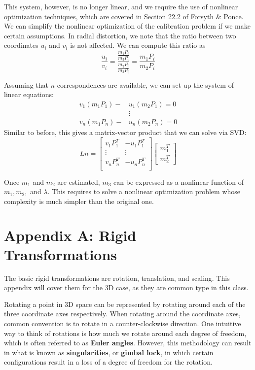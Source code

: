 \documentclass[a4paper, 12pt]{article}
\renewcommand\emph{\textbf}
\begin{document}
This system, however, is no longer linear, and we require the use of nonlinear optimization techniques, which are covered in Section 22.2 of Forsyth \& Ponce. We can simplify the nonlinear optimization of the calibration problem if we make certain assumptions. In radial distortion, we note that the ratio between two coordinates $u_i$ and $v_i$ is not affected. We can compute this ratio as
\begin{equation}
    \frac{u_i}{v_i} = \frac{\frac{m_1P_i}{m_3P_i}}{\frac{m_2P_i}{m_3P_i}} = \frac{m_1P_i}{m_2P_i}
\end{equation}

Assuming that $n$ correspondences are available, we can set up the system of linear equations:
\begin{align*}
    v_1(m_1P_1)-&u_1(m_2P_1) = 0\\
    &\vdots\\
    v_n(m_1P_n)-&u_n(m_2P_n) = 0
\end{align*}
Similar to before, this gives a matrix-vector product that we can solve via SVD:
\begin{equation}
    Ln = \begin{bmatrix}
    v_1P_1^T & -u_1P_1^T\\
    \vdots & \vdots\\
    v_nP_n^T & -u_nP_n^T\\ 
    \end{bmatrix}
    \begin{bmatrix}
    m_1^T\\m_2^T
    \end{bmatrix}
\end{equation}

Once $m_1$ and $m_2$ are estimated, $m_3$ can be expressed as a nonlinear function of $m_1,m_2,$ and $\lambda$. This requires to solve a nonlinear optimization problem whose complexity is much simpler than the original one.

\section{Appendix A: Rigid Transformations}
The basic rigid transformations are rotation, translation, and scaling. This appendix will cover them for the 3D case, as they are common type in this class. 

Rotating a point in 3D space can be represented by rotating around each of the three coordinate axes respectively. When rotating around the coordinate axes, common convention is to rotate in a counter-clockwise direction. One intuitive way to think of rotations is how much we rotate around each degree of freedom, which is often referred to as \emph{Euler angles}. However, this methodology can result in what is known as \emph{singularities}, or \emph{gimbal lock}, in which certain configurations result in a loss of a degree of freedom for the rotation. 
\end{document}

